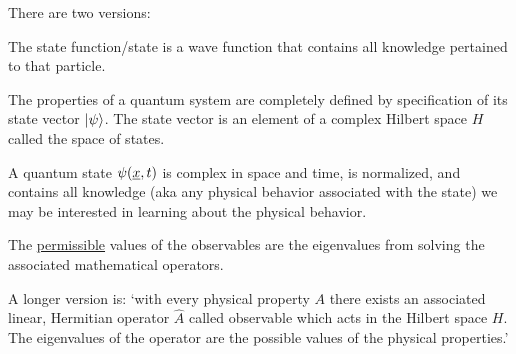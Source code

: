 \documentclass{school-22.101-notes}
\date{September 12, 2011}
\begin{document}
\maketitle

\begin{axiom} There are two versions:
  \begin{subaxiom}
    The state function/state is a wave function that contains all knowledge pertained to that particle. 
  \end{subaxiom}
  \begin{subaxiom}
    The properties of a quantum system are completely defined by specification of its state vector $\left| \psi \right>$. The state vector is an element of a complex Hilbert space $H$ called the space of states. 
  \end{subaxiom}
\end{axiom}
A quantum state $\psi(\underline{x}, t)$ is complex in space and time, is normalized, and contains all knowledge (aka any physical behavior associated with the state) we may be interested in learning about the physical behavior. 


\clearpage
{}
\begin{axiom} 
    The \uline{permissible} values of the observables are the eigenvalues from solving the associated mathematical operators.
\end{axiom}
    A longer version is: `with every physical property $A$ there exists an associated linear, Hermitian operator $\hat{A}$ called observable which acts in the Hilbert space $H$. The eigenvalues of the operator are the possible values of the physical properties.' 
\end{document}
